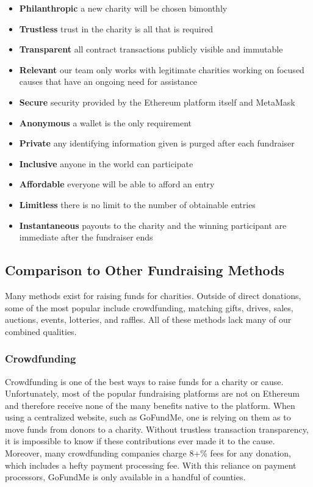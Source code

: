 \documentclass[11pt]{article}
\begin{document}
\begin{itemize}
\item{\textbf{Philanthropic} a new charity will be chosen bimonthly}
\item{\textbf{Trustless} trust in the charity is all that is required}
\item{\textbf{Transparent} all contract transactions publicly visible and immutable}
\item{\textbf{Relevant} our team only works with legitimate charities working on focused causes that have an ongoing need for assistance}
\item{\textbf{Secure} security provided by the Ethereum platform itself and MetaMask}
\item{\textbf{Anonymous} a wallet is the only requirement}
\item{\textbf{Private} any identifying information given is purged after each fundraiser}
\item{\textbf{Inclusive} anyone in the world can participate}
\item{\textbf{Affordable} everyone will be able to afford an entry}
\item{\textbf{Limitless} there is no limit to the number of obtainable entries}
\item{\textbf{Instantaneous} payouts to the charity and the winning participant are immediate after the fundraiser ends}
\end{itemize}

\subsection{Comparison to Other Fundraising Methods}

Many methods exist for raising funds for charities. Outside of direct donations, some of the most popular include crowdfunding, matching gifts, drives, sales, auctions, events, lotteries, and raffles. All of these methods lack many of our combined qualities.

\subsubsection{Crowdfunding}

Crowdfunding is one of the best ways to raise funds for a charity or cause. Unfortunately, most of the popular fundraising platforms are not on Ethereum and therefore receive none of the many benefits native to the platform. When using a centralized website, such as GoFundMe, one is relying on them as to move funds from donors to a charity. Without trustless transaction transparency, it is impossible to know if these contributions ever made it to the cause. Moreover, many crowdfunding companies charge 8+\% fees for any donation, which includes a hefty payment processing fee. With this reliance on payment processors, GoFundMe is only available in a handful of counties.
\end{document}

